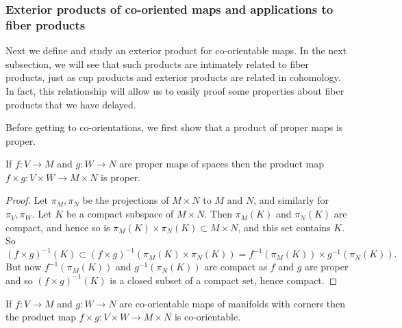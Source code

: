 \subsubsection{Exterior products of co-oriented maps and applications to fiber products}

Next we define and study an exterior product for co-orientable maps.
In the next subsection, we will see that such products are intimately related to fiber products, just as cup products and exterior products are related in cohomology.
In fact, this relationship will allow us to easily proof some properties about fiber products that we have delayed.

Before getting to co-orientations, we first show that a product of proper maps is proper.

\begin{lemma}\label{L: proper product}
	If $f \colon V \to M$ and $g \colon W \to N$ are proper maps of spaces then the product map $f \times g \colon V \times W \to M \times N$ is proper.
\end{lemma}

\begin{proof}
	Let $\pi_M,\pi_N$ be the projections of $M \times N$ to $M$ and $N$, and similarly for $\pi_V, \pi_W$.
	Let $K$ be a compact subspace of $M \times N$.
	Then $\pi_M(K)$ and $\pi_N(K)$ are compact, and hence so is $\pi_M(K) \times \pi_N(K) \subset M \times N$, and this set contains $K$.
	So
	$$(f \times g)^{-1}(K) \subset (f \times g)^{-1}(\pi_M(K) \times \pi_N(K)) = f^{-1}(\pi_M(K)) \times g^{-1}(\pi_N(K)).$$
	But now $f^{-1}(\pi_M(K))$ and $g^{-1}(\pi_N(K))$ are compact as $f$ and $g$ are proper and so $(f \times g)^{-1}(K)$ is a closed subset of a compact set, hence compact.
\end{proof}

\begin{lemma}
	If $f \colon V \to M$ and $g \colon W \to N$ are co-orientable maps of manifolds with corners then the product map $f \times g \colon V \times W \to M \times N$ is co-orientable.
\end{lemma}

